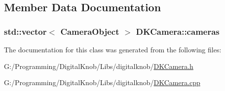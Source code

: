 \subsection{Member Data Documentation}
\hypertarget{class_d_k_camera_a2f817d697f2ad27e934452a1635fb5d8}{
\subsubsection[{cameras}]{\setlength{\rightskip}{0pt plus 5cm}std\-::vector$<$ {\bf Camera\-Object} $>$ D\-K\-Camera\-::cameras\hspace{0.3cm}{\ttfamily [static]}}}\label{class_d_k_camera_a2f817d697f2ad27e934452a1635fb5d8}


The documentation for this class was generated from the following files\-:\begin{DoxyCompactItemize}
\item 
G\-:/\-Programming/\-Digital\-Knob/\-Libs/digitalknob/\hyperlink{_d_k_camera_8h}{D\-K\-Camera.\-h}\item 
G\-:/\-Programming/\-Digital\-Knob/\-Libs/digitalknob/\hyperlink{_d_k_camera_8cpp}{D\-K\-Camera.\-cpp}\end{DoxyCompactItemize}
